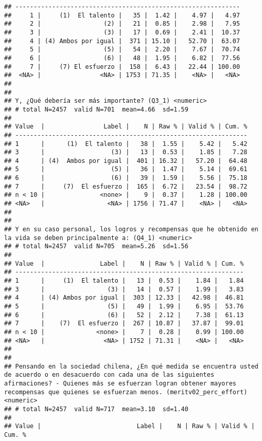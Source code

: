 \documentclass[
  10,
  landscape,
  legalpaper]{article}
\begin{document}
\begin{verbatim}
## -------------------------------------------------------------
##     1 |     (1)  El talento |   35 |  1.42 |    4.97 |   4.97
##     2 |                 (2) |   21 |  0.85 |    2.98 |   7.95
##     3 |                 (3) |   17 |  0.69 |    2.41 |  10.37
##     4 | (4) Ambos por igual |  371 | 15.10 |   52.70 |  63.07
##     5 |                 (5) |   54 |  2.20 |    7.67 |  70.74
##     6 |                 (6) |   48 |  1.95 |    6.82 |  77.56
##     7 |     (7) El esfuerzo |  158 |  6.43 |   22.44 | 100.00
##  <NA> |                <NA> | 1753 | 71.35 |    <NA> |   <NA>
## 
## 
## Y, ¿Qué debería ser más importante? (Q3_1) <numeric>
## # total N=2457  valid N=701  mean=4.66  sd=1.59
## 
## Value  |                Label |    N | Raw % | Valid % | Cum. %
## ---------------------------------------------------------------
## 1      |      (1)  El talento |   38 |  1.55 |    5.42 |   5.42
## 3      |                  (3) |   13 |  0.53 |    1.85 |   7.28
## 4      | (4)  Ambos por igual |  401 | 16.32 |   57.20 |  64.48
## 5      |                  (5) |   36 |  1.47 |    5.14 |  69.61
## 6      |                  (6) |   39 |  1.59 |    5.56 |  75.18
## 7      |     (7)  El esfuerzo |  165 |  6.72 |   23.54 |  98.72
## n < 10 |               <none> |    9 |  0.37 |    1.28 | 100.00
## <NA>   |                 <NA> | 1756 | 71.47 |    <NA> |   <NA>
## 
## 
## Y en su caso personal, los logros y recompensas que he obtenido en la vida se deben principalmente a: (Q4_1) <numeric>
## # total N=2457  valid N=705  mean=5.26  sd=1.56
## 
## Value  |               Label |    N | Raw % | Valid % | Cum. %
## --------------------------------------------------------------
## 1      |     (1)  El talento |   13 |  0.53 |    1.84 |   1.84
## 3      |                 (3) |   14 |  0.57 |    1.99 |   3.83
## 4      | (4) Ambos por igual |  303 | 12.33 |   42.98 |  46.81
## 5      |                 (5) |   49 |  1.99 |    6.95 |  53.76
## 6      |                 (6) |   52 |  2.12 |    7.38 |  61.13
## 7      |    (7)  El esfuerzo |  267 | 10.87 |   37.87 |  99.01
## n < 10 |              <none> |    7 |  0.28 |    0.99 | 100.00
## <NA>   |                <NA> | 1752 | 71.31 |    <NA> |   <NA>
## 
## 
## Pensando en la sociedad chilena, ¿En qué medida se encuentra usted de acuerdo o en desacuerdo con cada una de las siguientes afirmaciones? - Quienes más se esfuerzan logran obtener mayores recompensas que quienes se esfuerzan menos. (meritv02_perc_effort) <numeric>
## # total N=2457  valid N=717  mean=3.10  sd=1.40
## 
## Value |                          Label |    N | Raw % | Valid % | Cum. %

\end{verbatim}
\end{document}
